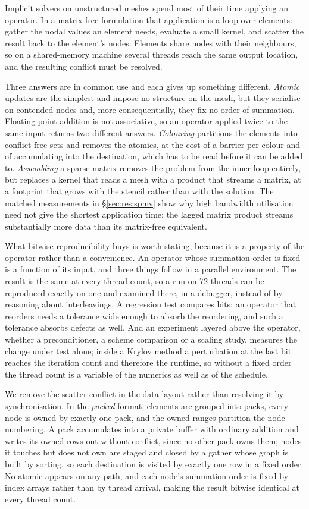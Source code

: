 \documentclass[sigconf,nonacm]{acmart}
\begin{document}
Implicit solvers on unstructured meshes spend most of their time applying an operator. In a
matrix-free formulation that application is a loop over elements: gather the nodal values an
element needs, evaluate a small kernel, and scatter the result back to the element's nodes.
Elements share nodes with their neighbours, so on a shared-memory machine several threads reach
the same output location, and the resulting conflict must be resolved.

Three answers are in common use and each gives up something different. \emph{Atomic} updates
are the simplest and impose no structure on the mesh, but they serialise on contended nodes and,
more consequentially, they fix no order of summation. Floating-point addition is not
associative, so an operator applied twice to the same input returns two different answers.
\emph{Colouring} partitions the elements into conflict-free sets and removes the atomics, at the
cost of a barrier per colour and of accumulating into the destination, which has to be read
before it can be added to. \emph{Assembling} a sparse matrix removes
the problem from the inner loop entirely, but replaces a kernel that reads a mesh with a product
that streams a matrix, at a footprint that grows with the stencil rather than with the solution.
The matched measurements in \S\ref{sec:res:spmv} show why high bandwidth
utilisation need not give the shortest application time: the lagged matrix
product streams substantially more data than its matrix-free equivalent.

What bitwise reproducibility buys is worth stating, because it is a property of the operator
rather than a convenience. An operator whose summation order is fixed is a function of its input,
and three things follow in a parallel environment. The result is the same at every thread count,
so a run on 72 threads can be reproduced exactly on one and examined there, in a debugger,
instead of by reasoning about interleavings. A regression test compares bits; an operator that
reorders needs a tolerance wide enough to absorb the reordering, and such a tolerance absorbs
defects as well. And an
experiment layered above the operator, whether a preconditioner, a scheme comparison or a scaling
study, measures the change under test alone; inside a Krylov method a perturbation at the last
bit reaches the iteration count and therefore the runtime, so without a fixed order the thread
count is a variable of the numerics as well as of the schedule.

We remove the scatter conflict in the data layout rather than resolving it by synchronisation. In
the \emph{packed} format, elements are grouped into packs, every node is owned by exactly one pack,
and the owned ranges partition the node numbering. A pack accumulates into a private buffer with
ordinary addition and writes its owned rows out without conflict, since no other pack owns them;
nodes it touches but does not own are staged and closed by a gather whose graph is built by
sorting, so each destination is visited by exactly one row in a fixed order. No atomic appears on
any path, and each node's summation order is fixed by index arrays rather than by thread arrival,
making the result bitwise identical at every thread count.
\end{document}
